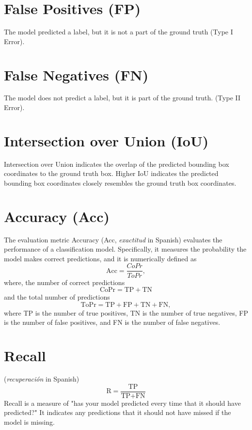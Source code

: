 \section{False Positives (FP)}
The model predicted a label, but it is not a part of the ground truth (Type I Error).

\section{False Negatives (FN)}
The model does not predict a label, but it is part of the ground truth. (Type II Error).

\section{Intersection over Union (IoU)}
Intersection over Union indicates the overlap of the predicted
bounding box coordinates to the ground truth box. Higher IoU indicates
the predicted bounding box coordinates closely resembles the ground
truth box coordinates.

\section{Accuracy (Acc)}
The evaluation metric Accuracy (Acc, \emph{exactitud} in Spanish) evaluates the performance of a
classification model. Specifically, it measures the probability the model
makes correct predictions, and it is numerically defined as
\begin{equation}
  \text{Acc} = \frac{CoPr}{ToPr},
\end{equation}
where, the number of correct predictions
\begin{equation}
  \text{CoPr} = \text{TP} + \text{TN}
\end{equation}
and the total number of predictions
\begin{equation}
  \text{ToPr} = \text{TP} + \text{FP} + \text{TN} + \text{FN},
\end{equation}
where TP is the number of true positives, TN is the number of true
negatives, FP is the number of false positives, and FN is the number
of false negatives.

\section{Recall}
(\emph{recuperación} in Spanish)
\begin{equation}
  \text{R} = \frac{\text{TP}}{\text{TP} + \text{FN}}
\end{equation}
Recall is a measure of "has your model predicted every time that it
should have predicted?" It indicates any predictions that it should
not have missed if the model is missing.


